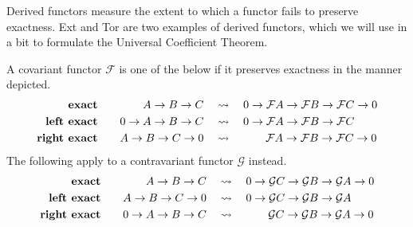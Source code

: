 \documentclass[twoside,10pt]{article}
\begin{document}
Derived functors measure the extent to which a functor fails to preserve exactness. Ext and Tor are two examples of derived functors, which we will use in a bit to formulate the Universal Coefficient Theorem.

\begin{defn}[]
        A covariant functor $\mathcal{F}$ is one of the below if it preserves exactness in the manner depicted.
\begin{equation*}
        \begin{aligned}[c]
                \text{\textbf{exact}} \\
                \text{\textbf{left exact}} \\
                \text{\textbf{right exact}}
        \end{aligned}
        \qquad
        \begin{aligned}[c]
                A\to B\to C \quad&\leadsto\quad 0\to \mathcal{F}A\to \mathcal{F}B\to \mathcal{F}C\to 0\\
                0\to A\to B\to C \quad&\leadsto\quad 0\to \mathcal{F}A\to \mathcal{F}B\to \mathcal{F}C\\
                A\to B\to C\to 0 \quad&\leadsto\quad \qquad \mathcal{F}A\to \mathcal{F}B\to \mathcal{F}C\to 0
        \end{aligned}
\end{equation*}
The following apply to a contravariant functor $\mathcal{G}$ instead.
\begin{equation*}
        \begin{aligned}[c]
                \text{\textbf{exact}} \\
                \text{\textbf{left exact}} \\
                \text{\textbf{right exact}}
        \end{aligned}
        \qquad
        \begin{aligned}[c]
                A\to B\to C \quad&\leadsto\quad 0\to \mathcal{G}C\to \mathcal{G}B\to \mathcal{G}A\to 0\\
                A\to B\to C\to 0 \quad&\leadsto\quad 0\to \mathcal{G}C\to \mathcal{G}B\to \mathcal{G}A\\
                0\to A\to B\to C \quad&\leadsto\quad \qquad \mathcal{G}C\to \mathcal{G}B\to \mathcal{G}A\to 0
        \end{aligned}
\end{equation*}
\end{defn}

\end{document}
